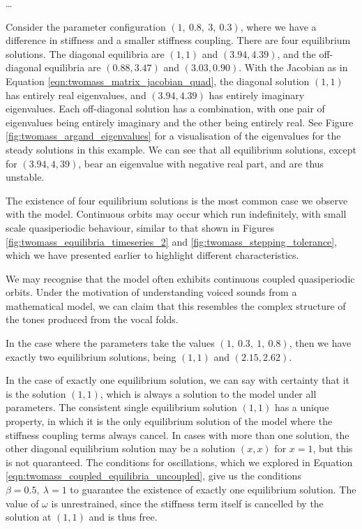 \documentclass{article}
\begin{document}
\dots


Consider the parameter configuration \((1,~0.8,~3,~0.3)\), where we have a difference in stiffness and a smaller stiffness coupling.
There are four equilibrium solutions.
The diagonal equilibria are \((1,1)\) and \((3.94,4.39)\),
and the off-diagonal equilibria are \((0.88,3.47)\) and \((3.03,0.90)\).
With the Jacobian as in Equation \ref{eqn:twomass_matrix_jacobian_quad},
the diagonal solution \((1,1)\) has entirely real eigenvalues, and \((3.94,4.39)\) has entirely imaginary eigenvalues.
Each off-diagonal solution has a combination, with one pair of eigenvalues being entirely imaginary and the other being entirely real.
See Figure \ref{fig:twomass_argand_eigenvalues} for a visualisation of the eigenvalues for the steady solutions in this example.
We can see that all equilibrium solutions, except for \((3.94,4,39)\), bear an eigenvalue with negative real part, and are thus unstable.

The existence of four equilibrium solutions is the most common case we observe with the model.
Continuous orbits may occur which run indefinitely, with small scale quasiperiodic behaviour,
similar to that shown in Figures \ref{fig:twomass_equilibria_timeseries_2} and \ref{fig:twomass_stepping_tolerance},
which we have presented earlier to highlight different characteristics.

We may recognise that the model often exhibits continuous coupled quasiperiodic orbits.
Under the motivation of understanding voiced sounds from a mathematical model,
we can claim that this resembles the complex structure of the tones produced from the vocal folds.


In the case where the parameters take the values \((1,~0.3,~1,~0.8)\),
then we have exactly two equilibrium solutions,
being \((1,1)\) and \((2.15,2.62)\).



In the case of exactly one equilibrium solution,
we can say with certainty that it is the solution \((1,1)\),
which is always a solution to the model under all parameters.
The consistent single equilibrium solution \((1,1)\) has a unique property,
in which it is the only equilibrium solution of the model where the stiffness coupling terms always cancel.
In cases with more than one solution, the other diagonal equilibrium solution may be a solution \((x,x)\) for $x=1$,
but this is not quaranteed.
The conditions for oscillations,
which we explored in Equation \ref{eqn:twomass_coupled_equilibria_uncoupled},
give us the conditions \(\beta=0.5,~\lambda=1\) to guarantee the existence of exactly one equilibrium solution.
The value of $\omega$ is unrestrained, since the stiffness term itself is cancelled by the solution at \((1,1)\) and is thus free.
\end{document}
